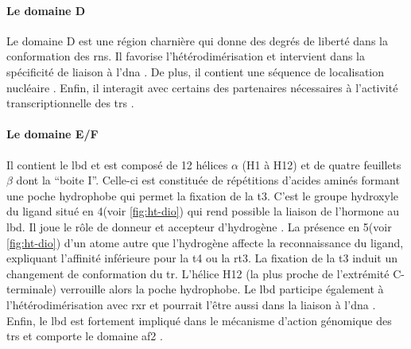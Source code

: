 \documentclass[../main.tex]{subfiles}
\begin{document}
\paragraph{Le domaine D}
Le domaine D est une région charnière qui donne des degrés de liberté dans la conformation des \glspl{rn}.
Il favorise l'hétérodimérisation et intervient dans la spécificité de liaison à l'\gls{dna} \citep{Miyamoto2001}.
De plus, il contient une séquence de localisation nucléaire \citep{Hamy1992a}.
Enfin, il interagit avec certains des partenaires nécessaires à l'activité transcriptionnelle des \glspl{tr} \citep{Lin1991,Horlein1995}.

\paragraph{Le domaine E/F}
Il contient le \gls{lbd} et est composé de 12 hélices $\alpha$ (H1 à H12) et de quatre feuillets $\beta$ dont la ``boite I''.
Celle-ci est constituée de répétitions d'acides aminés formant une poche hydrophobe qui permet la fixation de la \gls{t3}.
C'est le groupe hydroxyle du ligand situé en 4\prime (voir \autoref{fig:ht-dio}) qui rend possible la liaison de l'hormone au \gls{lbd}.
Il joue le rôle de donneur et accepteur d’hydrogène \citep{Dietrich1977}.
La présence en 5\prime (voir \autoref{fig:ht-dio}) d'un atome autre que l'hydrogène affecte la reconnaissance du ligand, expliquant l'affinité inférieure pour la \gls{t4} ou la \gls{rt3}.
La fixation de la \gls{t3} induit un changement de conformation du \gls{tr}.
L'hélice H12 (la plus proche de l'extrémité C-terminale) verrouille alors la poche hydrophobe.
Le \gls{lbd} participe également à l'hétérodimérisation avec \gls{rxr} \citep{Wagner1995,Bain2007} et pourrait l'être aussi dans la liaison à l'\gls{dna} \citep{Figueira2010}.
Enfin, le \gls{lbd} est fortement impliqué dans le mécanisme d'action génomique des \glspl{tr} et comporte le domaine \gls{af2} \citep{Barettino1994,Tone1994}.

\end{document}
